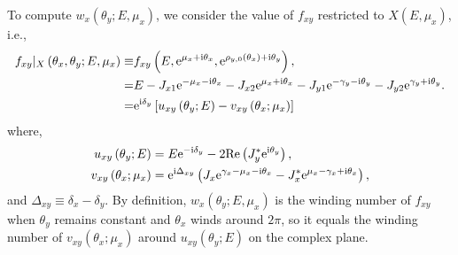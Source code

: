 To compute $w_{x}(\theta_{y};E,\mu_{x})$, we consider the value of
$f_{xy}$ restricted to $X(E,\mu_{x})$, i.e., 
\begin{align}
f_{xy}|_{X}\left(\theta_{x},\theta_{y};E,\mu_{x}\right)\equiv & f_{xy}\left(E,\mathrm{e}^{\mu_{x}+\mathrm{i}\theta_{x}},\mathrm{e}^{\rho_{y,0}(\theta_{x})+\mathrm{i}\theta_{y}}\right),\nonumber \\
= & E-J_{x1}\mathrm{e}^{-\mu_{x}-\mathrm{i}\theta_{x}}-J_{x2}\mathrm{e}^{\mu_{x}+\mathrm{i}\theta_{x}}-J_{y1}\mathrm{e}^{-\gamma_{y}-\mathrm{i}\theta_{y}}-J_{y2}\mathrm{e}^{\gamma_{y}+\mathrm{i}\theta_{y}}.\nonumber \\
= & \mathrm{e}^{\mathrm{i}\delta_{y}}\left[u_{xy}\left(\theta_{y};E\right)-v_{xy}\left(\theta_{x};\mu_{x}\right)\right]
\end{align}
where, 
\begin{align}
u_{xy}\left(\theta_{y};E\right) & =E\mathrm{e}^{-\mathrm{i}\delta_{y}}-2\text{Re}\left(J_{y}^{*}\mathrm{e}^{\mathrm{i}\theta_{y}}\right),\label{eq:uxy}\\
v_{xy}\left(\theta_{x};\mu_{x}\right) & =\mathrm{e}^{\mathrm{i}\Delta_{xy}}\left(J_{x}\mathrm{e}^{\gamma_{x}-\mu_{x}-\mathrm{i}\theta_{x}}-J_{x}^{*}\mathrm{e}^{\mu_{x}-\gamma_{x}+\mathrm{i}\theta_{x}}\right),\label{eq:vxy}
\end{align}
and $\Delta_{xy}\equiv\delta_{x}-\delta_{y}$. By definition, $w_{x}(\theta_{y};E,\mu_{x})$
is the winding number of $f_{xy}$ when $\theta_{y}$ remains constant
and $\theta_{x}$ winds around $2\pi$, so it equals the winding number
of $v_{xy}(\theta_{x};\mu_{x})$ around $u_{xy}(\theta_{y};E)$ on
the complex plane.

